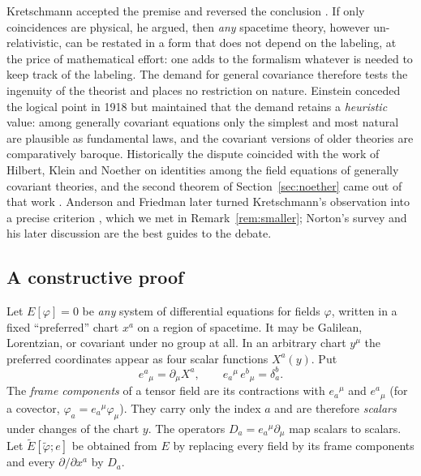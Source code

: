 Kretschmann accepted the premise and reversed the conclusion
\cite{kretschmann}. If only coincidences are physical, he argued, then
\emph{any} spacetime theory, however un-relativistic, can be restated in a form
that does not depend on the labeling, at the price of mathematical effort: one
adds to the formalism whatever is needed to keep track of the labeling. The
demand for general covariance therefore tests the ingenuity of the theorist and
places no restriction on nature. Einstein conceded the logical point in 1918
\cite{einstein1918} but maintained that the demand retains a \emph{heuristic}
value: among generally covariant equations only the simplest and most natural
are plausible as fundamental laws, and the covariant versions of older theories
are comparatively baroque. Historically the dispute coincided with the work of
Hilbert, Klein and Noether on identities among the field equations of
generally covariant theories, and the second theorem of
Section~\ref{sec:noether} came out of that work \cite{ks}. Anderson and
Friedman later turned Kretschmann's observation into a precise criterion
\cite{anderson,friedman}, which we met in Remark~\ref{rem:smaller}; Norton's
survey \cite{norton} and his later discussion \cite{bc} are the best guides to
the debate.

\subsection{A constructive proof}

Let $E[\varphi]=0$ be \emph{any} system of differential equations for fields
$\varphi$, written in a fixed ``preferred'' chart $x^a$ on a region of
spacetime. It may be Galilean, Lorentzian, or covariant under no group at all.
In an arbitrary chart $y^\mu$ the preferred coordinates appear as four scalar
functions $X^a(y)$. Put
\begin{equation}\label{eq:soldering}
  e^a{}_\mu=\partial_\mu X^a,\qquad
  e_a{}^\mu\,e^b{}_\mu=\delta_a^b .
\end{equation}
The \emph{frame components} of a tensor field are its contractions with
$e_a{}^\mu$ and $e^a{}_\mu$ (for a covector, $\varphi_a=e_a{}^\mu\varphi_\mu$).
They carry only the index $a$ and are therefore \emph{scalars} under changes
of the chart $y$. The operators $D_a=e_a{}^\mu\partial_\mu$ map scalars to
scalars. Let $\tilde E[\tilde\varphi;e]$ be obtained from $E$ by replacing every
field by its frame components and every $\partial/\partial x^a$ by $D_a$.

